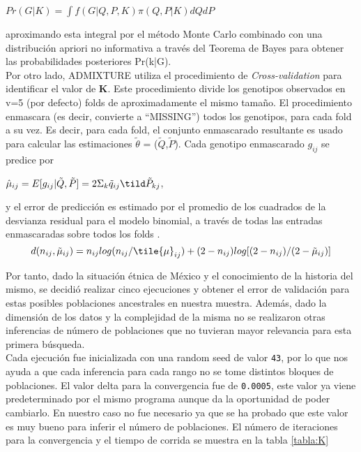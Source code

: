 \begin{center}
  $Pr(G|K) = \int f(G|Q,P,K)\pi(Q,P|K)dQdP$
\end{center}

\noindent aproximando esta integral por el m\'etodo Monte Carlo combinado con una distribuci\'on apriori no informativa a trav\'es del Teorema de Bayes para obtener las probabilidades posteriores Pr(k|G). \\

Por otro lado, ADMIXTURE utiliza el procedimiento de \textit{Cross-validation} para identificar el valor de \textbf{K}. Este procedimiento divide los genotipos observados en v=5 (por defecto) folds de aproximadamente el mismo tamaño. El procedimiento enmascara (es decir, convierte a ``MISSING'') todos los genotipos, para cada fold a su vez. Es decir, para cada fold, el conjunto enmascarado  resultante es usado para calcular las estimaciones $\tilde{\theta}$ = ($\tilde{Q}$,$\tilde{P}$). Cada genotipo enmascarado \textit{$g_{ij}$} se predice por

\begin{center}$\hat{\mu}_{ij} = E[g_{ij}|\tilde{Q},\tilde{P}] = 2\Sigma_{k}\tilde{q}_{ij}\tild\tilde{P}_{kj}$, \end{center}

\noindent y el error de predicci\'on es estimado por el promedio de los cuadrados de la desvianza residual para el modelo binomial, a trav\'es de todas las entradas enmascaradas sobre todos los folds \cite{Yushi,Admixture}.\\

\begin{equation}
  d(n_{ij},\tilde{\mu}_{ij}) = n_{ij}log(n_{ij}/\tile{\mu}_{ij}) + (2-n_{ij})log[(2-n_{ij})/(2-\tilde{\mu}_{ij})]
\end{equation}

Por tanto, dado la situaci\'on \'etnica de M\'exico y el conocimiento de la historia del mismo, se decidi\'o realizar cinco ejecuciones y obtener el error de validaci\'on para estas posibles poblaciones ancestrales en nuestra muestra. Adem\'as, dado la dimensi\'on de los datos y la complejidad de la misma no se realizaron otras inferencias de n\'umero de poblaciones que no tuvieran mayor relevancia para esta primera b\'usqueda.\\

Cada ejecuci\'on fue inicializada con una random seed de valor \texttt{43}, por lo que nos ayuda a que cada inferencia para cada rango no se tome distintos bloques de poblaciones. El valor delta para la convergencia fue de \texttt{0.0005}, este valor ya viene predeterminado por el mismo programa aunque da la oportunidad de poder cambiarlo. En nuestro caso no fue necesario ya que se ha probado que este valor es muy bueno para inferir el n\'umero de poblaciones. El n\'umero de iteraciones para la convergencia y el tiempo de corrida se muestra en la tabla \ref{tabla:K}\\


